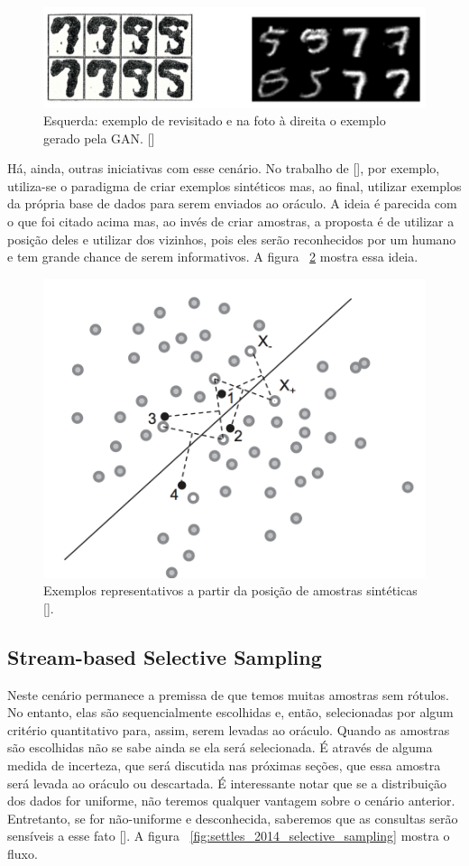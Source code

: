 \begin{figure}
  \centering
  \includegraphics[width=.9\textwidth]{figures/generative_GAN_AL_5_vs_9.png}
  \caption{Esquerda: exemplo de \cite{baum1992query} revisitado e na foto à direita o exemplo gerado pela GAN. [\cite{zhu2017generative}]}
  \label{fig:GAN_5_vs_9}
\end{figure}


Há, ainda, outras iniciativas com esse cenário. No trabalho de [\cite{wang2015active}], por exemplo, utiliza-se o paradigma de criar exemplos sintéticos mas, ao final, utilizar exemplos da própria base de dados para serem enviados ao oráculo. A ideia é parecida com o que foi citado acima mas, ao invés de criar amostras, a proposta é de utilizar a posição deles e utilizar dos vizinhos, pois eles serão reconhecidos por um humano e tem grande chance de serem informativos. A figura ~\ref{fig:wang_2015_membership}  mostra essa ideia. 

\begin{figure}
  \centering
  \includegraphics[width=.5\textwidth]{figures/wang_2015_membership.png}
  \caption{Exemplos representativos a partir da posição de amostras sintéticas [\cite{wang2015active}].}
  \label{fig:wang_2015_membership}
\end{figure}


\subsection{Stream-based Selective Sampling}
\label{sec:cenarios_selective_sampling}

Neste cenário permanece a premissa de que temos muitas amostras sem rótulos. No entanto, elas são sequencialmente escolhidas e, então, selecionadas por algum critério quantitativo para, assim, serem levadas ao oráculo. Quando as amostras são escolhidas não se sabe ainda se ela será selecionada. É através de alguma medida de incerteza, que será discutida nas próximas seções, que essa amostra será levada ao oráculo ou descartada. É interessante notar que se a distribuição dos dados for uniforme, não teremos qualquer vantagem sobre o cenário anterior. Entretanto, se for não-uniforme e desconhecida, saberemos que as consultas serão sensíveis a esse fato [\cite{settles2014active}]. A figura ~\ref{fig:settles_2014_selective_sampling} mostra o fluxo. 

